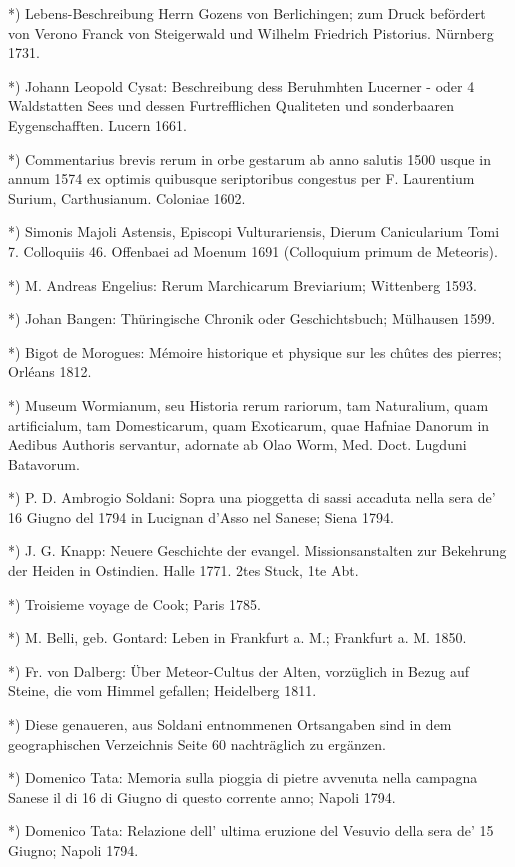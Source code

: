 \documentclass[a4paper, 11pt, oneside, polutonikogreek, german]{article}
\begin{document}
*) Lebens-Beschreibung Herrn Gozens von Berlichingen; zum Druck befördert von Verono Franck von Steigerwald und Wilhelm Friedrich Pistorius. Nürnberg 1731.

*) Johann Leopold Cysat: Beschreibung dess Beruhmhten Lucerner - oder 4 Waldstatten Sees und dessen Furtrefflichen Qualiteten und sonderbaaren Eygenschafften. Lucern 1661.

*) Commentarius brevis rerum in orbe gestarum ab anno salutis 1500 usque in annum 1574 ex optimis quibusque seriptoribus congestus per F. Laurentium Surium, Carthusianum. Coloniae 1602.

*) Simonis Majoli Astensis, Episcopi Vulturariensis, Dierum Canicularium Tomi 7. Colloquiis 46. Offenbaei ad Moenum 1691 (Colloquium primum de Meteoris).

*) M. Andreas Engelius: Rerum Marchicarum Breviarium; Wittenberg 1593.

*) Johan Bangen: Thüringische Chronik oder Geschichtsbuch; Mülhausen 1599.

*) Bigot de Morogues: Mémoire historique et physique sur les chûtes des pierres; Orléans 1812.

*) Museum Wormianum, seu Historia rerum rariorum, tam Naturalium, quam artificialum, tam Domesticarum, quam Exoticarum, quae Hafniae Danorum in Aedibus Authoris servantur, adornate ab Olao Worm, Med. Doct. Lugduni Batavorum.

*) P. D. Ambrogio Soldani: Sopra una pioggetta di sassi accaduta nella sera de' 16 Giugno del 1794 in Lucignan d'Asso nel Sanese; Siena 1794.

*) J. G. Knapp: Neuere Geschichte der evangel. Missionsanstalten zur Bekehrung der Heiden in Ostindien. Halle 1771. 2tes Stuck, 1te Abt.

*) Troisieme voyage de Cook; Paris 1785.

*) M. Belli, geb. Gontard: Leben in Frankfurt a. M.; Frankfurt a. M. 1850.

*) Fr. von Dalberg: Über Meteor-Cultus der Alten, vorzüglich in Bezug auf Steine, die vom Himmel gefallen; Heidelberg 1811.

*) Diese genaueren, aus Soldani entnommenen Ortsangaben sind in dem geographischen Verzeichnis Seite 60 nachträglich zu ergänzen.

*) Domenico Tata: Memoria sulla pioggia di pietre avvenuta nella campagna Sanese il di 16 di Giugno di questo corrente anno; Napoli 1794.

*) Domenico Tata: Relazione dell' ultima eruzione del Vesuvio della sera de' 15 Giugno; Napoli 1794.
\end{document}
